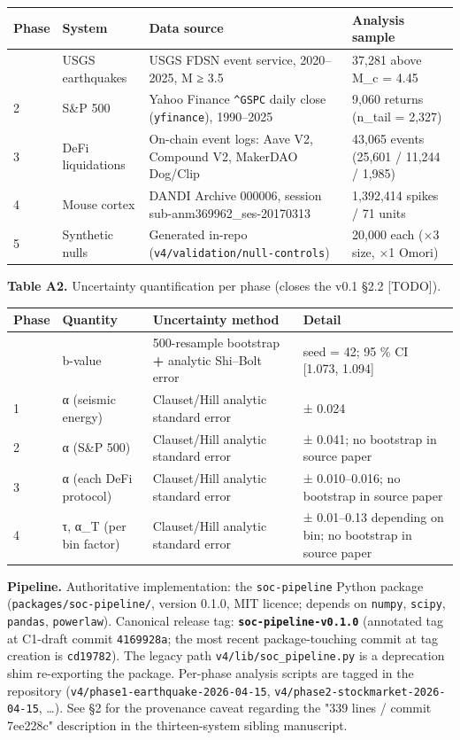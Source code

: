 \documentclass[
  11pt]{article}
\newcounter{none} %
\begin{document}
{\def\LTcaptype{none} %
\begin{longtable}[]{@{}llll@{}}
\toprule\noalign{}
Phase & System & Data source & Analysis sample \\
\midrule\noalign{}
\endhead
\bottomrule\noalign{}
\endlastfoot
1 & USGS earthquakes & USGS FDSN event service, 2020--2025, M ≥ 3.5 &
37,281 above M\_c = 4.45 \\
2 & S\&P 500 & Yahoo Finance \texttt{\^{}GSPC} daily close
(\texttt{yfinance}), 1990--2025 & 9,060 returns (n\_tail = 2,327) \\
3 & DeFi liquidations & On-chain event logs: Aave V2, Compound V2,
MakerDAO Dog/Clip & 43,065 events (25,601 / 11,244 / 1,985) \\
4 & Mouse cortex & DANDI Archive 000006, session
sub-anm369962\_ses-20170313 & 1,392,414 spikes / 71 units \\
5 & Synthetic nulls & Generated in-repo
(\texttt{v4/validation/null-controls}) & 20,000 each (×3 size, ×1
Omori) \\
\end{longtable}
}

\textbf{Table A2.} Uncertainty quantification per phase (closes the v0.1
§2.2 {[}TODO{]}).

{\def\LTcaptype{none} %
\begin{longtable}[]{@{}llll@{}}
\toprule\noalign{}
Phase & Quantity & Uncertainty method & Detail \\
\midrule\noalign{}
\endhead
\bottomrule\noalign{}
\endlastfoot
1 & b-value & 500-resample bootstrap \textbf{+} analytic Shi--Bolt error
& seed = 42; 95 \% CI {[}1.073, 1.094{]} \\
1 & α (seismic energy) & Clauset/Hill analytic standard error & ±
0.024 \\
2 & α (S\&P 500) & Clauset/Hill analytic standard error & ± 0.041; no
bootstrap in source paper \\
3 & α (each DeFi protocol) & Clauset/Hill analytic standard error & ±
0.010--0.016; no bootstrap in source paper \\
4 & τ, α\_T (per bin factor) & Clauset/Hill analytic standard error & ±
0.01--0.13 depending on bin; no bootstrap in source paper \\
\end{longtable}
}

\textbf{Pipeline.} Authoritative implementation: the
\texttt{soc-pipeline} Python package (\texttt{packages/soc-pipeline/},
version 0.1.0, MIT licence; depends on \texttt{numpy}, \texttt{scipy},
\texttt{pandas}, \texttt{powerlaw}). Canonical release tag:
\textbf{\texttt{soc-pipeline-v0.1.0}} (annotated tag at C1-draft commit
\texttt{4169928a}; the most recent package-touching commit at tag
creation is \texttt{cd19782}). The legacy path
\texttt{v4/lib/soc\_pipeline.py} is a deprecation shim re-exporting the
package. Per-phase analysis scripts are tagged in the repository
(\texttt{v4/phase1-earthquake-2026-04-15},
\texttt{v4/phase2-stockmarket-2026-04-15}, \ldots). See §2 for the
provenance caveat regarding the "339 lines / commit 7ee228c" description
in the thirteen-system sibling manuscript.
\end{document}

